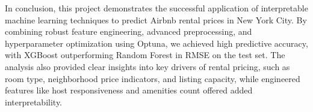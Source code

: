 \documentclass[12pt]{article}
\begin{document}
In conclusion, this project demonstrates the successful application of interpretable machine learning techniques to predict Airbnb rental prices in New York City. By combining robust feature engineering, advanced preprocessing, and hyperparameter optimization using Optuna, we achieved high predictive accuracy, with XGBoost outperforming Random Forest in RMSE on the test set. The analysis also provided clear insights into key drivers of rental pricing, such as room type, neighborhood price indicators, and listing capacity, while engineered features like host responsiveness and amenities count offered added interpretability.


\nocite{*}
\printbibliography
\end{document}
